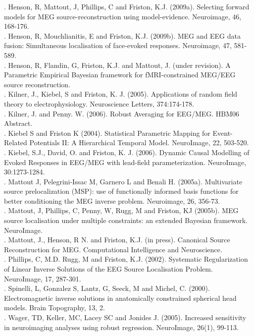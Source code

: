. Henson, R, Mattout, J, Phillips, C and Friston, K.J. (2009a). Selecting forward models for MEG source-reconstruction using model-evidence. Neuroimage, 46, 168-176.\\

. Henson, R, Mouchlianitis, E and Friston, K.J. (2009b). MEG and EEG data fusion: Simultaneous localisation of face-evoked responses. Neuroimage, 47, 581-589.\\

. Henson, R, Flandin, G, Friston, K.J. and Mattout, J. (under revision). A Parametric Empirical Bayesian framework for fMRI-constrained MEG/EEG source reconstruction.\\

. Kilner, J., Kiebel, S and Friston, K. J. (2005). Applications of random field theory to electrophysiology. Neuroscience Letters, 374:174-178.\\

. Kilner, J. and Penny. W. (2006). Robust Averaging for EEG/MEG. HBM06 Abstract.\\

. Kiebel S and Friston K (2004). Statistical Parametric Mapping for Event-Related Potentials II: A Hierarchical Temporal Model. NeuroImage, 22, 503-520.\\

. Kiebel, S.J., David, O. and Friston, K. J. (2006). Dynamic Causal Modelling of Evoked Responses in EEG/MEG with lead-field parameterization. NeuroImage, 30:1273-1284.\\

. Mattout J, Pelegrini-Issac M, Garnero L and Benali H. (2005a). Multivariate source prelocalization (MSP): use of functionally informed basis functions for better conditioning the MEG inverse problem. Neuroimage, 26, 356-73.\\

. Mattout, J, Phillips, C, Penny, W, Rugg, M and Friston, KJ (2005b). MEG source localisation under multiple constraints: an extended Bayesian framework. NeuroImage.\\

. Mattout, J., Henson, R N. and Friston, K.J. (in press). Canonical Source Reconstruction for MEG. Computational Intelligence and Neuroscience.\\

. Phillips, C, M.D. Rugg, M and Friston, K.J. (2002). Systematic Regularization of Linear Inverse Solutions of the EEG Source Localisation Problem. NeuroImage, 17, 287-301.\\

. Spinelli, L, Gonzalez S, Lantz, G, Seeck, M and Michel, C. (2000). Electromagnetic inverse solutions in anatomically constrained spherical head models. Brain Topography, 13, 2.\\

. Wager, TD, Keller, MC, Lacey SC and Jonides J. (2005). Increased sensitivity in neuroimaging analyses using robust regression. NeuroImage, 26(1), 99-113.\\